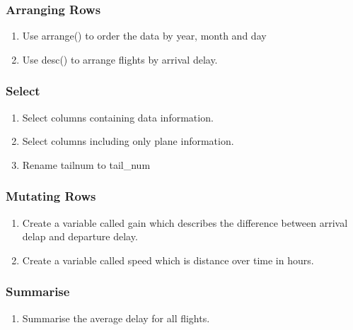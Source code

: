 \documentclass[]{article}
\providecommand{\tightlist}{%
  \setlength{\itemsep}{0pt}\setlength{\parskip}{0pt}}
\begin{document}
\subsubsection{Arranging Rows}\label{arranging-rows}

\begin{enumerate}
\def\labelenumi{\arabic{enumi}.}
\setcounter{enumi}{2}
\tightlist
\item
  Use arrange() to order the data by year, month and day
\item
  Use desc() to arrange flights by arrival delay.
\end{enumerate}

\subsubsection{Select}\label{select}

\begin{enumerate}
\def\labelenumi{\arabic{enumi}.}
\setcounter{enumi}{4}
\tightlist
\item
  Select columns containing data information.
\item
  Select columns including only plane information.
\item
  Rename tailnum to tail\_num
\end{enumerate}

\subsubsection{Mutating Rows}\label{mutating-rows}

\begin{enumerate}
\def\labelenumi{\arabic{enumi}.}
\setcounter{enumi}{7}
\tightlist
\item
  Create a variable called gain which describes the difference between
  arrival delap and departure delay.
\item
  Create a variable called speed which is distance over time in hours.
\end{enumerate}

\subsubsection{Summarise}\label{summarise}

\begin{enumerate}
\def\labelenumi{\arabic{enumi}.}
\setcounter{enumi}{9}
\tightlist
\item
  Summarise the average delay for all flights.
\end{enumerate}
\end{document}
